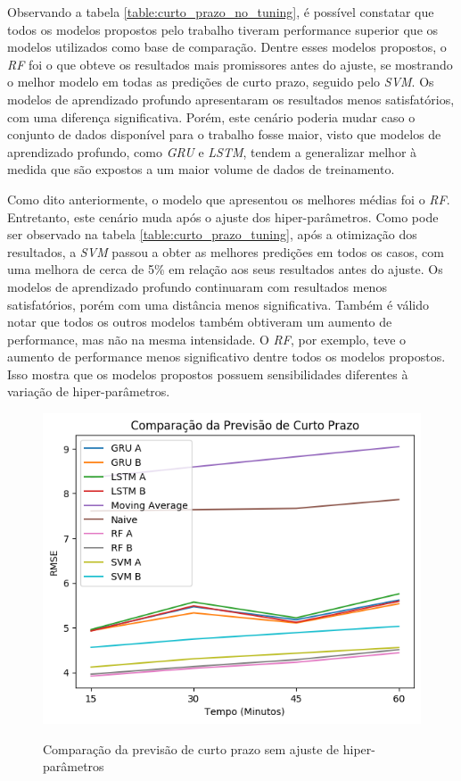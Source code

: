  Observando a tabela \ref{table:curto_prazo_no_tuning}, é possível constatar que todos os modelos propostos pelo trabalho tiveram performance superior que os modelos utilizados como base de comparação. Dentre esses modelos propostos, o \textit{\acrshort{RF}} foi o que obteve os resultados mais promissores antes do ajuste, se mostrando o melhor modelo em todas as predições de curto prazo, seguido pelo \textit{\acrshort{SVM}}. Os modelos de aprendizado profundo apresentaram os resultados menos satisfatórios, com uma diferença significativa. Porém, este cenário poderia mudar caso o conjunto de dados disponível para o trabalho fosse maior, visto que modelos de aprendizado profundo, como \textit{\acrshort{GRU}} e \textit{\acrshort{LSTM}}, tendem a generalizar melhor à medida que são expostos a um maior volume de dados de treinamento. 

Como dito anteriormente, o modelo que apresentou os melhores médias foi o \textit{\acrshort{RF}}. Entretanto, este cenário muda após o ajuste dos hiper-parâmetros. Como pode ser observado na tabela \ref{table:curto_prazo_tuning}, após a otimização dos resultados, a \textit{\acrshort{SVM}} passou a obter as melhores predições em todos os casos, com uma melhora de cerca de 5\% em relação aos seus resultados antes do ajuste. Os modelos de aprendizado profundo continuaram com resultados menos satisfatórios, porém com uma distância menos significativa. Também é válido notar que todos os outros modelos também obtiveram um aumento de performance, mas não na mesma intensidade. O \textit{\acrshort{RF}}, por exemplo, teve o aumento de performance menos significativo dentre todos os modelos propostos. Isso mostra que os modelos propostos possuem sensibilidades diferentes à variação de hiper-parâmetros.
 
 \begin{figure}[H]
    \centering
    \includegraphics[scale=0.9]{monography/img/comparisons/comparacao_da_previsao_de_curto_prazo_rmse.png}
    \label{figure:pred_no_tuning}
    \caption{Comparação da previsão de curto prazo sem ajuste de hiper-parâmetros}
\end{figure}

